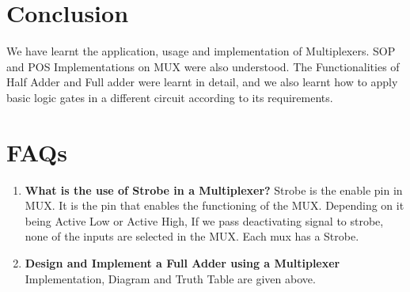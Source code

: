 \documentclass[11pt]{article}
\begin{document}
\section{Conclusion}
We have learnt the application, usage and implementation of Multiplexers. SOP and POS Implementations on MUX were also understood. The Functionalities of Half Adder and Full adder were learnt in detail, and we also learnt how to apply basic logic gates in a different circuit according to its requirements.

\pagebreak
\section{FAQs}

\begin{enumerate}
	\item \textbf{ What is the use of Strobe in a Multiplexer?}
	      Strobe is the enable pin in MUX. It is the pin that enables the functioning of the MUX. Depending on it being Active Low or Active High, If we pass deactivating signal to strobe, none of the inputs are selected in the MUX. Each mux has a Strobe.
	\item \textbf{Design and Implement a Full Adder using a Multiplexer}
	      Implementation, Diagram and Truth Table are given above.
\end{enumerate}
\end{document}
